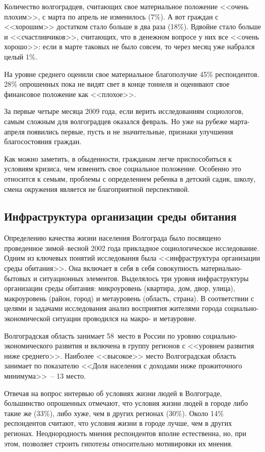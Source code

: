   Количество волгоградцев, считающих свое материальное положение <<очень
  плохим>>, с марта по апрель не изменилось (7\%). А вот граждан с <<хорошим>>
  достатком стало больше в два раза (18\%). Вдвойне стало больше и
  <<счастливчиков>>, считающих, что в денежном вопросе у них все <<очень
  хорошо>>: если в марте таковых не было совсем, то через месяц уже набрался
  целый 1\%.
  
  На уровне среднего оценили свое материальное благополучие 45\% респондентов.
  28\% опрошенных пока не видят свет в конце тоннеля и оценивают свое финансовое
  положение как <<плохое>>.
  
  За первые четыре месяца 2009 года, если верить исследованиям социологов, самым
  сложным для волгоградцев оказался февраль. Но уже на рубеже марта-апреля
  появились первые, пусть и не значительные, признаки улучшения благосостояния
  граждан.
  
  Как можно заметить, в обыденности, гражданам легче приспособиться к условиям
  кризиса, чем изменить свое социальное положение. Особенно это относится к
  семьям, проблемы с определением ребенка в детский садик, школу, смена
  окружения является не благоприятной перспективой.\cite{v102}
  
  \subsection{Инфраструктура организации среды обитания}  

  Определению качества жизни населения Волгограда было посвящено проведенное
  зимой--весной 2002 года прикладное социологическое исследование\cite{vstu}.
  Одним из ключевых понятий исследования была <<инфраструктура организации
  среды обитания>>. Она включает в себя в себя совокупность материально-бытовых
  и ситуационных элементов. Выделялось три уровня инфраструктуры организации
  среды обитания: микроуровень (квартира, дом, двор, улица), макроуровень
  (район, город) и метауровень (область, страна). В соответствии с целями и
  задачами исследования анализ восприятия жителями города
  социально-экономической ситуации проводился на макро- и метауровне.

  Волгоградская область занимает 58~место в России по уровню
  социально-экономического развития и включена в группу регионов с <<уровнем
  развития ниже среднего>>. Наиболее <<высокое>> место Волгоградская область
  занимает по показателю <<Доля населения с доходами ниже прожиточного
  минимума>>~-- 13 место.
  
  Отвечая на вопрос интервью об условиях жизни людей в Волгограде, большинство
  опрошенных отмечают, что условия жизни людей в городе либо такие же (33\%),
  либо хуже, чем в других регионах (30\%). Около 14\% респондентов считают, что
  условия жизни в городе лучше, чем в других регионах. Неоднородность мнения
  респондентов вполне естественна, но, при этом, позволяет строить гипотезы
  относительно мотивировки их мнения.
  
